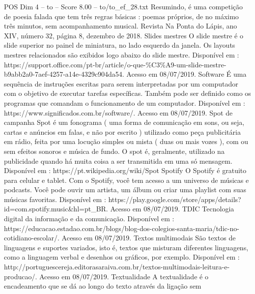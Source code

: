 \begin{textsample}{POS Dim 4 – to – Score 8.00 – to/to\_ef\_28.txt}
Resumindo, é uma competição de poesia falada que tem três regras básicas : poemas próprios, de no máximo três minutos, sem acompanhamento musical.
Revista Na Ponta do Lápis, ano XIV, número 32, página 8, dezembro de 2018.
Slides mestres O slide mestre é o slide superior no painel de miniatura, no lado esquerdo da janela.
Os layouts mestres relacionados são exibidos logo abaixo do slide mestre.
Disponível em : https://support.office.com/pt-br/article/o-que-\%C3\%A9-um-slide-mestre-b9abb2a0-7aef-4257-a14e-4329c904da54.
Acesso em 08/07/2019.
Software É uma sequência de instruções escritas para serem interpretadas por um computador com o objetivo de executar tarefas específicas.
Também pode ser definido como os programas que comandam o funcionamento de um computador.
Disponível em : https://www.significados.com.br/software/.
Acesso em 08/07/2019.
Spot de campanha Spot é um fonograma ( uma forma de comunicação em sons, ou seja, cartas e anúncios em falas, e não por escrito ) utilizado como peça publicitária em rádio, feita por uma locução simples ou mista ( duas ou mais vozes ), com ou sem efeitos sonoros e música de fundo.
O spot é, geralmente, utilizado na publicidade quando há muita coisa a ser transmitida em uma só mensagem.
Disponível em : https://pt.wikipedia.org/wiki/Spot Spotify O Spotify é gratuito para celular e tablet.
Com o Spotify, você tem acesso a um universo de músicas e podcasts.
Você pode ouvir um artista, um álbum ou criar uma playlist com suas músicas favoritas.
Disponível em : https://play.google.com/store/apps/details? id=com.spotify.music\&hl=pt\_BR.
Acesso em 08/07/2019.
TDIC Tecnologia digital da informação e da comunicação.
Disponível em : https://educacao.estadao.com.br/blogs/blog-dos-colegios-santa-maria/tdic-no-cotidiano-escolar/.
Acesso em 08/07/2019.
Textos multimodais São textos de linguagens e suportes variados, isto é, textos que misturam diferentes linguagens, como a linguagem verbal e desenhos ou gráficos, por exemplo.
Disponível em : http://portuguescereja.editorasaraiva.com.br/textos-multimodais-leitura-e-producao/.
Acesso em 08/07/2019.
Textualidade A textualidade é o encadeamento que se dá ao longo do texto através da ligação sem

\end{textsample}
